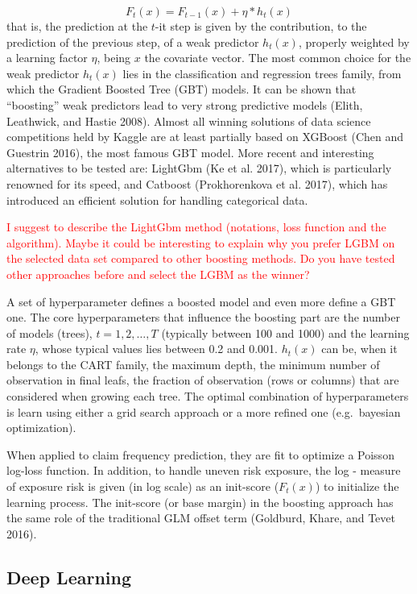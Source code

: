 \documentclass[
]{article}
\begin{document}
\[F_t\left(x\right)=F_{t-1}\left(x\right)+\eta*h_t\left(x\right)\] that
is, the prediction at the \(t\)-it step is given by the contribution, to
the prediction of the previous step, of a weak predictor
\(h_t\left(x\right)\), properly weighted by a learning factor \(\eta\),
being \(x\) the covariate vector. The most common choice for the weak
predictor \(h_t\left(x\right)\) lies in the classification and
regression trees family, from which the Gradient Boosted Tree (GBT)
models. It can be shown that ``boosting'' weak predictors lead to very
strong predictive models (Elith, Leathwick, and Hastie 2008). Almost all
winning solutions of data science competitions held by Kaggle are at
least partially based on XGBoost (Chen and Guestrin 2016), the most
famous GBT model. More recent and interesting alternatives to be tested
are: LightGbm (Ke et al. 2017), which is particularly renowned for its
speed, and Catboost (Prokhorenkova et al. 2017), which has introduced an
efficient solution for handling categorical data.

\textcolor{red}{I suggest to describe the LightGbm method (notations, loss function and the algorithm). Maybe it could be interesting to explain why you prefer LGBM on the selected data set compared to other boosting methods. Do you have tested other approaches before and select the LGBM as the winner?}

A set of hyperparameter defines a boosted model and even more define a
GBT one. The core hyperparameters that influence the boosting part are
the number of models (trees), \(t=1,2,\ldots, T\) (typically between 100
and 1000) and the learning rate \(\eta\), whose typical values lies
between 0.2 and 0.001. \(h_t\left(x\right)\) can be, when it belongs to
the CART family, the maximum depth, the minimum number of observation in
final leafs, the fraction of observation (rows or columns) that are
considered when growing each tree. The optimal combination of
hyperparameters is learn using either a grid search approach or a more
refined one (e.g.~bayesian optimization).

When applied to claim frequency prediction, they are fit to optimize a
Poisson log-loss function. In addition, to handle uneven risk exposure,
the log - measure of exposure risk is given (in log scale) as an
init-score (\(F_t\left(x\right)\)) to initialize the learning process.
The init-score (or base margin) in the boosting approach has the same
role of the traditional GLM offset term (Goldburd, Khare, and Tevet
2016).

\hypertarget{deep-learning}{%
\subsection{Deep Learning}\label{deep-learning}}
\end{document}
